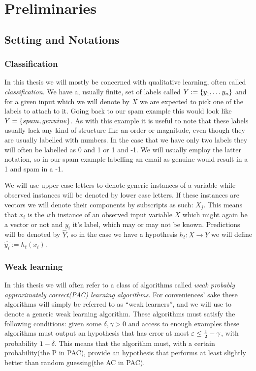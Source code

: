 
\chapter{Preliminaries}
\label{chap:prelim}
\section{Setting and Notations}
\subsection{Classification} 
\label{subsec:class}
\par {} In this thesis we will mostly be concerned with qualitative learning, often called \textit{classification}\cite{Hastie2009}. We have a, usually finite, set of labels called $Y:=\left\{y_1,\ldots y_n\right\}$ and for a given input which we will denote by $X$ we are expected to pick one of the labels to attach to it. Going back to our spam example this would look like $Y=\left\{spam, genuine\right\}$. As with this example it is useful to note that these labels usually lack any kind of structure like an order or magnitude, even though they are usually labelled with numbers. In the case that we have only two labels they will often be labelled as 0 and 1 or 1 and -1. We will usually employ the latter notation, so in our spam example labelling an email as genuine would result in a 1 and spam in a -1. 

\par We will use upper case letters to denote generic instances of a variable while observed instances will be denoted by lower case letters. If these instances are vectors we will denote their components by subscripts as such: $X_j$. This means that $x_i$ is the $i$th instance of an observed input variable $X$ which might again be a vector or not and $y_i$ it's label, which may or may not be known.  Predictions will be denoted by $\hat Y$, so in the case we have a hypothesis $h_t:X\to Y$ we will define $\hat{y_i}:=h_t(x_i)$.  

\subsection{Weak learning}
\label{subsec:weak}
In this thesis we will often refer to a class of algorithms called \textit{weak probably approximately correct(PAC) learning algorithms}\cite{Freund1997}. For conveniences' sake these algorithms will simply be referred to as ``weak learners'', and we will use \weak to denote a generic weak learning algorithm. These algorithms must satisfy the following conditions: given some $\delta,\gamma >0$ and access to enough examples these algorithms must output an hypothesis that has error at most $\varepsilon \leq \frac12-\gamma$, with probability $1-\delta$. This means that the algorithm must, with a certain probability(the P in PAC), provide an hypothesis that performs at least slightly better than random guessing(the AC in PAC). 

